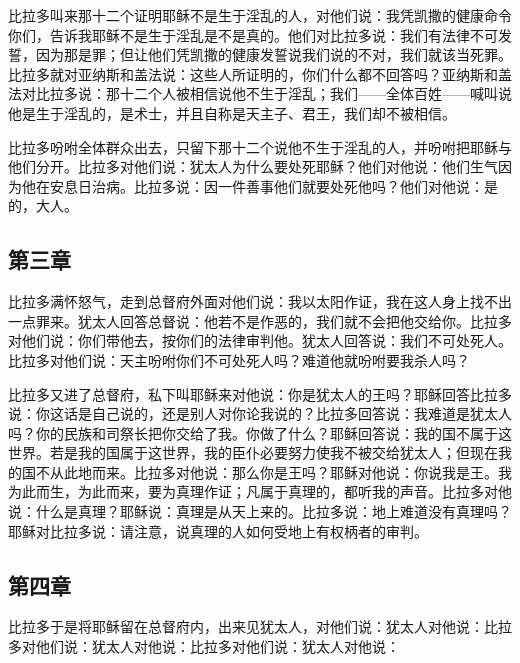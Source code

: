 比拉多叫来那十二个证明耶稣不是生于淫乱的人，对他们说：我凭凯撒的健康命令你们，告诉我耶稣不是生于淫乱是不是真的。他们对比拉多说：我们有法律不可发誓，因为那是罪；但让他们凭凯撒的健康发誓说我们说的不对，我们就该当死罪。比拉多就对亚纳斯和盖法说：这些人所证明的，你们什么都不回答吗？亚纳斯和盖法对比拉多说：那十二个人被相信说他不生于淫乱；我们——全体百姓——喊叫说他是生于淫乱的，是术士，并且自称是天主子、君王，我们却不被相信。\par

比拉多吩咐全体群众出去，只留下那十二个说他不生于淫乱的人，并吩咐把耶稣与他们分开。比拉多对他们说：犹太人为什么要处死耶稣？他们对他说：他们生气因为他在安息日治病。比拉多说：因一件善事他们就要处死他吗？他们对他说：是的，大人。\par


\subsection{第三章}

比拉多满怀怒气，走到总督府外面对他们说：我以太阳作证，我在这人身上找不出一点罪来。犹太人回答总督说：他若不是作恶的，我们就不会把他交给你。比拉多对他们说：你们带他去，按你们的法律审判他。犹太人回答说：我们不可处死人。比拉多对他们说：天主吩咐你们不可处死人吗？难道他就吩咐要我杀人吗？\par

比拉多又进了总督府，私下叫耶稣来对他说：你是犹太人的王吗？耶稣回答比拉多说：你这话是自己说的，还是别人对你论我说的？比拉多回答说：我难道是犹太人吗？你的民族和司祭长把你交给了我。你做了什么？耶稣回答说：我的国不属于这世界。若是我的国属于这世界，我的臣仆必要努力使我不被交给犹太人；但现在我的国不从此地而来。比拉多对他说：那么你是王吗？耶稣对他说：你说我是王。我为此而生，为此而来，要为真理作证；凡属于真理的，都听我的声音。比拉多对他说：什么是真理？耶稣说：真理是从天上来的。比拉多说：地上难道没有真理吗？耶稣对比拉多说：请注意，说真理的人如何受地上有权柄者的审判。\par


\subsection{第四章}

比拉多于是将耶稣留在总督府内，出来见犹太人，对他们说：犹太人对他说：比拉多对他们说：犹太人对他说：比拉多对他们说：犹太人对他说：\par

